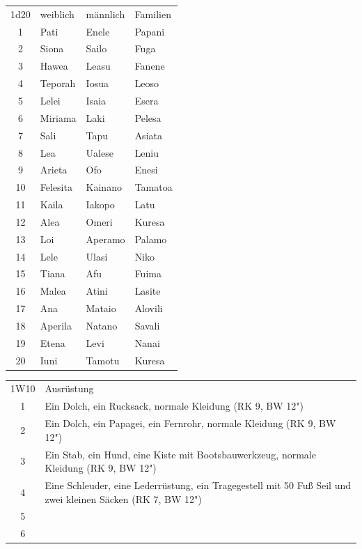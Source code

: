 \documentclass[11pt]{wbzine}
\begin{document}
\begin{multicols}{2}
\begin{tabularx}{\columnwidth}{clll}
    1d20 &  weiblich    &    männlich    &    Familien \\
    1   &    Pati       &     Enele      &     Papani \\
    2    &   Siona      &     Sailo      &     Fuga\\
    3   &    Hawea      &     Leasu      &     Fanene\\
    4    &   Teporah    &     Iosua      &     Leoso\\
    5     &  Lelei      &     Isaia      &     Esera\\
    6     &  Miriama   &      Laki       &     Pelesa\\
    7     &  Sali      &      Tapu       &     Asiata\\
    8     &  Lea       &      Ualese     &     Leniu\\
    9      & Arieta    &      Ofo        &     Enesi\\
    10     & Felesita  &      Kainano    &     Tamatoa\\
    11     & Kaila     &      Iakopo     &     Latu\\
    12    &  Alea      &      Omeri      &     Kuresa\\
    13    &  Loi       &      Aperamo    &     Palamo\\
    14    &  Lele      &      Ulasi      &     Niko\\
    15     & Tiana     &      Afu        &     Fuima\\
    16     & Malea     &      Atini      &     Lasite\\
    17     & Ana       &      Mataio     &     Alovili\\
    18     & Aperila   &      Natano     &     Savali\\
    19     & Etena     &      Levi       &     Nanai\\
    20     & Iuni      &      Tamotu     &     Kuresa\\
\end{tabularx}

\begin{tabularx}{\columnwidth}{cZ}
    1W10 & Ausrüstung \\
    1 &
    Ein Dolch, ein Rucksack, normale Kleidung (RK 9, BW 12") \\
    2 &
    Ein Dolch, ein Papagei, ein Fernrohr, normale Kleidung (RK 9, BW
    12")\\
    3 & 
    Ein Stab, ein Hund, eine Kiste mit Bootsbauwerkzeug, normale
    Kleidung (RK 9, BW 12") \\
    4 & 
    Eine Schleuder, eine Lederrüstung, ein Tragegestell mit 50 Fuß
    Seil und zwei kleinen Säcken (RK 7, BW 12") \\
    5 &
    \\
6 &
\\


\end{tabularx}
\end{multicols}
\end{document}
